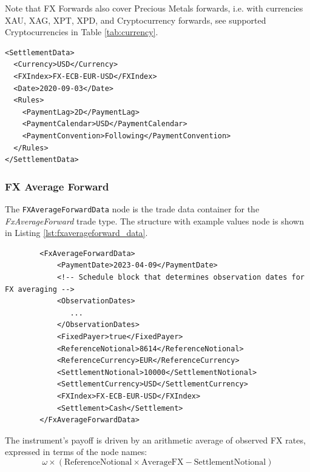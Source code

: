 Note that FX Forwards also cover Precious Metals forwards, i.e. with currencies XAU, XAG, XPT, XPD, and Cryptocurrency forwards,  see supported Cryptocurrencies in Table \ref{tab:currency}.

\begin{listing}[H]
\begin{verbatim}
<SettlementData>
  <Currency>USD</Currency>
  <FXIndex>FX-ECB-EUR-USD</FXIndex>
  <Date>2020-09-03</Date>
  <Rules>
    <PaymentLag>2D</PaymentLag>
    <PaymentCalendar>USD</PaymentCalendar>
    <PaymentConvention>Following</PaymentConvention>
  </Rules>
</SettlementData>
\end{verbatim}
\caption{Example \lstinline!SettlementData! node with \lstinline!Rules! sub-node}
\label{lst:settlement_data_node}
\end{listing}

\subsubsection{FX Average Forward}

The \lstinline!FXAverageForwardData! node is the trade data container for the \emph{FxAverageForward} trade type.  The structure with
example values node is shown in Listing \ref{lst:fxaverageforward_data}.

\begin{listing}[H]
\begin{verbatim}
        <FxAverageForwardData>
            <PaymentDate>2023-04-09</PaymentDate>
            <!-- Schedule block that determines observation dates for FX averaging -->
            <ObservationDates>
               ...
            </ObservationDates>
            <FixedPayer>true</FixedPayer>
            <ReferenceNotional>8614</ReferenceNotional>
            <ReferenceCurrency>EUR</ReferenceCurrency>
            <SettlementNotional>10000</SettlementNotional>
            <SettlementCurrency>USD</SettlementCurrency>
            <FXIndex>FX-ECB-EUR-USD</FXIndex>
            <Settlement>Cash</Settlement>
        </FxAverageForwardData>
\end{verbatim}
\caption{FX Average Forward data}
\label{lst:fxaverageforward_data}
\end{listing}

The instrument's payoff is driven by an arithmetic average of observed FX rates, expressed in terms of the node names:
$$
   \omega \times \left( \mbox{ReferenceNotional} \times \mbox{AverageFX} - \mbox{SettlementNotional}\right)
$$
   
